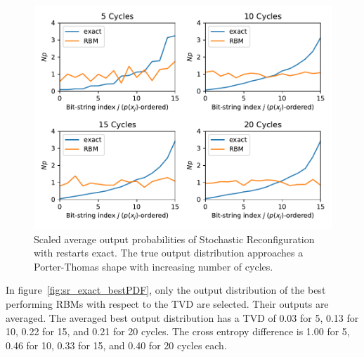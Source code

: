 \begin{figure}[H]
  \centering
  \includegraphics[width=\textwidth]{figures/results/SR-restarts-not-learned/avgPDF.pdf}
  \caption[Scaled average output probabilities of Stochastic Reconfiguration with restarts exact]{
    Scaled average output probabilities of Stochastic Reconfiguration with restarts exact. The true 
    output distribution approaches a Porter-Thomas shape with increasing number of cycles.}
  \label{fig:sr_exact_avgPDF}
\end{figure}

In figure~\ref{fig:sr_exact_bestPDF}, only the output distribution of the best performing RBMs with respect to the 
TVD are selected. Their outputs are averaged. The averaged best output distribution 
has a TVD of 0.03 for 5, 0.13 for 10, 0.22 for 15, and 0.21 for 20 
cycles. The cross entropy difference is 1.00 for 5, 0.46 for 10, 0.33 for 15, and 0.40 for 20 cycles each. 


